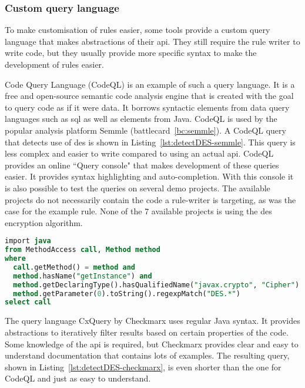 \subsubsection{Custom query language}
To make customisation of rules easier, some tools provide a custom query language that makes abstractions of their \gls{api}.
They still require the rule writer to write code, but they usually provide more specific syntax to make the development of rules easier.

Code Query Language (CodeQL) is an example of such a query language.
It is a free and open-source semantic code analysis engine that is created with the goal to query code as if it were data.
It borrows syntactic elements from data query languages such as \gls{sql} as well as elements from Java.
CodeQL is used by the popular analysis platform Semmle (battlecard~\ref{bc:semmle}).
A CodeQL query that detects use of \gls{des} is shown in Listing~\ref{lst:detectDES-semmle}.
This query is less complex and easier to write compared to using an actual \gls{api}.
CodeQL provides an online ``Query console" that makes development of these queries easier.
It provides syntax highlighting and auto-completion.
With this console it is also possible to test the queries on several demo projects.
The available projects do not necessarily contain the code a rule-writer is targeting, as was the case for the example rule.
None of the 7 available projects is using the \gls{des} encryption algorithm.

\begin{lstlisting}[language={sql},caption={CodeQL query used by Semmle to find use of insecure algorithm DES.},label={lst:detectDES-semmle},abovecaptionskip=-0.0pt,xleftmargin=15pt]
import java
from MethodAccess call, Method method
where
  call.getMethod() = method and
  method.hasName("getInstance") and
  method.getDeclaringType().hasQualifiedName("javax.crypto", "Cipher") and
  method.getParameter(0).toString().regexpMatch("DES.*")
select call
\end{lstlisting}

The query language CxQuery by Checkmarx uses regular Java syntax.
It provides abstractions to iteratively filter results based on certain properties of the code.
Some knowledge of the \gls{api} is required, but Checkmarx provides  clear and easy to understand documentation that contains lots of examples.
The resulting query, shown in Listing~\ref{lst:detectDES-checkmarx}, is even shorter than the one for CodeQL and just as easy to understand.

